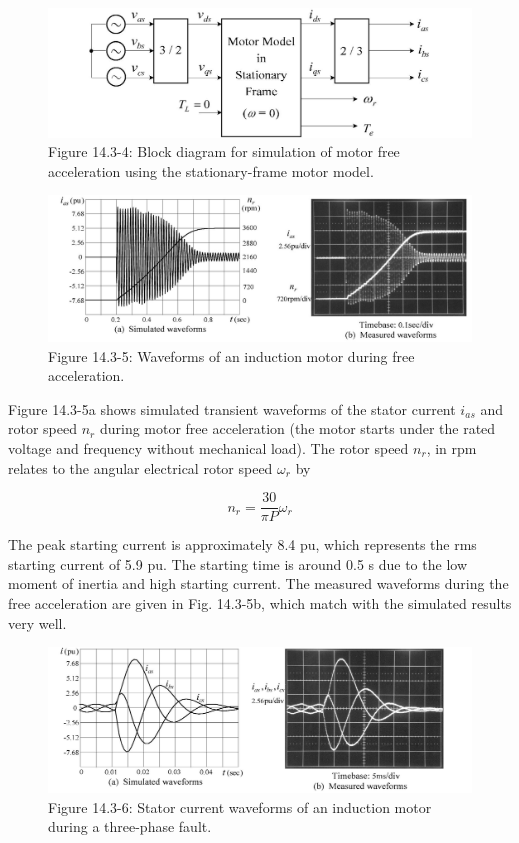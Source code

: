 \documentclass[letterpaper,12pt]{article}
\begin{document}
\begin{figure}[h]
\centering
\includegraphics{graficos/img06.jpg}
\caption{Figure 14.3-4: Block diagram for simulation of motor free acceleration using the stationary-frame motor model.}
\end{figure}
\FloatBarrier

\begin{figure}[h]
\centering
\includegraphics{graficos/img07.jpg}
\caption{Figure 14.3-5: Waveforms of an induction motor during free acceleration.}
\end{figure}
\FloatBarrier

Figure 14.3-5a shows simulated transient waveforms of the stator current $i_{as}$ and rotor speed $n_r$ during motor free acceleration (the motor starts under the rated voltage and frequency without mechanical load). The rotor speed $n_r$, in rpm relates to the angular electrical rotor speed $\omega_r$ by

\begin{equation}
n_r = \frac{30}{\pi P} \omega_r \tag{14.3-9}
\end{equation}

The peak starting current is approximately 8.4 pu, which represents the rms starting current of 5.9 pu. The starting time is around 0.5 s due to the low moment of inertia and high starting current. The measured waveforms during the free acceleration are given in Fig. 14.3-5b, which match with the simulated results very well.

\begin{figure}[h]
\centering
\includegraphics{graficos/img08.jpg}
\caption{Figure 14.3-6: Stator current waveforms of an induction motor during a three-phase fault.}
\end{figure}
\FloatBarrier
\end{document}
